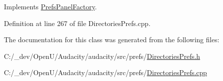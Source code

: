 Implements \hyperlink{class_prefs_panel_factory_a4814184d6050665a43f4929caa73aa0c}{Prefs\+Panel\+Factory}.



Definition at line 267 of file Directories\+Prefs.\+cpp.



The documentation for this class was generated from the following files\+:\begin{DoxyCompactItemize}
\item 
C\+:/\+\_\+dev/\+Open\+U/\+Audacity/audacity/src/prefs/\hyperlink{_directories_prefs_8h}{Directories\+Prefs.\+h}\item 
C\+:/\+\_\+dev/\+Open\+U/\+Audacity/audacity/src/prefs/\hyperlink{_directories_prefs_8cpp}{Directories\+Prefs.\+cpp}\end{DoxyCompactItemize}
